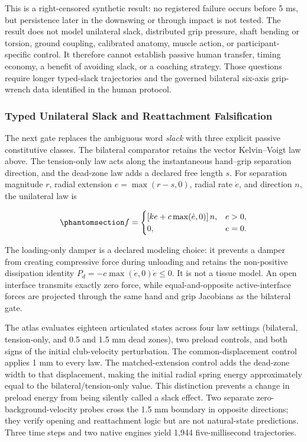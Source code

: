 \documentclass[
  letterpaper,
]{report}
\begin{document}
This is a right-censored synthetic result: no registered failure occurs
before 5 ms, but persistence later in the downswing or through impact is
not tested. The result does not model unilateral slack, distributed grip
pressure, shaft bending or torsion, ground coupling, calibrated anatomy,
muscle action, or participant-specific control. It therefore cannot
establish passive human transfer, timing economy, a benefit of avoiding
slack, or a coaching strategy. Those questions require longer
typed-slack trajectories and the governed bilateral six-axis grip-wrench
data identified in the human protocol.

\subsubsection{Typed Unilateral Slack and Reattachment
Falsification}\label{typed-unilateral-slack-and-reattachment-falsification}

The next gate replaces the ambiguous word \emph{slack} with three
explicit passive constitutive classes. The bilateral comparator retains
the vector Kelvin--Voigt law above. The tension-only law acts along the
instantaneous hand--grip separation direction, and the dead-zone law
adds a declared free length \(s\). For separation magnitude \(r\),
radial extension \(e=\max(r-s,0)\), radial rate \(\dot e\), and
direction \(n\), the unilateral law is

\begin{equation}\phantomsection\label{eq-articulated-slack-law}{
f =
\begin{cases}
\left[k e+c\max(\dot e,0)\right]n, & e>0,\\
0, & e=0.
\end{cases}
}\end{equation}

The loading-only damper is a declared modeling choice: it prevents a
damper from creating compressive force during unloading and retains the
non-positive dissipation identity \(P_d=-c\max(\dot e,0)\dot e\leq0\).
It is not a tissue model. An open interface transmits exactly zero
force, while equal-and-opposite active-interface forces are projected
through the same hand and grip Jacobians as the bilateral gate.

The atlas evaluates eighteen articulated states across four law settings
(bilateral, tension-only, and 0.5 and 1.5 mm dead zones), two preload
controls, and both signs of the initial club-velocity perturbation. The
common-displacement control applies 1 mm to every law. The
matched-extension control adds the dead-zone width to that displacement,
making the initial radial spring energy approximately equal to the
bilateral/tension-only value. This distinction prevents a change in
preload energy from being silently called a slack effect. Two separate
zero-background-velocity probes cross the 1.5 mm boundary in opposite
directions; they verify opening and reattachment logic but are not
natural-state predictions. Three time steps and two native engines yield
1,944 five-millisecond trajectories.
\end{document}
